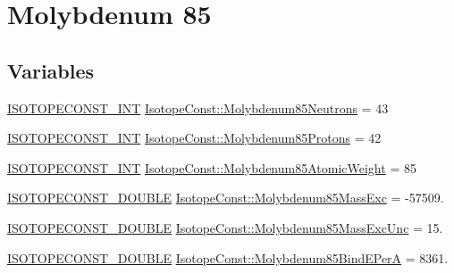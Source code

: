 \hypertarget{group___isotope_const-_molybdenum-_mo85}{}\section{Molybdenum 85}
\label{group___isotope_const-_molybdenum-_mo85}
\subsection*{Variables}
\begin{DoxyCompactItemize}
\item 
\mbox{\hyperlink{group___isotope_const-_macros_ga5f18360b3e99483a35c32d789e62621c}{I\+S\+O\+T\+O\+P\+E\+C\+O\+N\+S\+T\+\_\+\+I\+NT}} \mbox{\hyperlink{group___isotope_const-_molybdenum-_mo85_gab765595d82afa3d79d2e4f8b09eb5913}{Isotope\+Const\+::\+Molybdenum85\+Neutrons}} = 43
\item 
\mbox{\hyperlink{group___isotope_const-_macros_ga5f18360b3e99483a35c32d789e62621c}{I\+S\+O\+T\+O\+P\+E\+C\+O\+N\+S\+T\+\_\+\+I\+NT}} \mbox{\hyperlink{group___isotope_const-_molybdenum-_mo85_ga99ebaedfc45de54de861f08b9d0d892f}{Isotope\+Const\+::\+Molybdenum85\+Protons}} = 42
\item 
\mbox{\hyperlink{group___isotope_const-_macros_ga5f18360b3e99483a35c32d789e62621c}{I\+S\+O\+T\+O\+P\+E\+C\+O\+N\+S\+T\+\_\+\+I\+NT}} \mbox{\hyperlink{group___isotope_const-_molybdenum-_mo85_gaaa409c73213a32ac64914b02fd605df1}{Isotope\+Const\+::\+Molybdenum85\+Atomic\+Weight}} = 85
\item 
\mbox{\hyperlink{group___isotope_const-_macros_ga8f45a7272ce02c0b4c65c44636ed719a}{I\+S\+O\+T\+O\+P\+E\+C\+O\+N\+S\+T\+\_\+\+D\+O\+U\+B\+LE}} \mbox{\hyperlink{group___isotope_const-_molybdenum-_mo85_ga68330f74335fa53d888a7b5dcb446f46}{Isotope\+Const\+::\+Molybdenum85\+Mass\+Exc}} = -\/57509.
\item 
\mbox{\hyperlink{group___isotope_const-_macros_ga8f45a7272ce02c0b4c65c44636ed719a}{I\+S\+O\+T\+O\+P\+E\+C\+O\+N\+S\+T\+\_\+\+D\+O\+U\+B\+LE}} \mbox{\hyperlink{group___isotope_const-_molybdenum-_mo85_ga4c0d02209627c14699b0c4c35a01b513}{Isotope\+Const\+::\+Molybdenum85\+Mass\+Exc\+Unc}} = 15.
\item 
\mbox{\hyperlink{group___isotope_const-_macros_ga8f45a7272ce02c0b4c65c44636ed719a}{I\+S\+O\+T\+O\+P\+E\+C\+O\+N\+S\+T\+\_\+\+D\+O\+U\+B\+LE}} \mbox{\hyperlink{group___isotope_const-_molybdenum-_mo85_ga85b39197a76bc3572adf10ccb117ab17}{Isotope\+Const\+::\+Molybdenum85\+Bind\+E\+PerA}} = 8361.
\item 

\end{DoxyCompactItemize}
